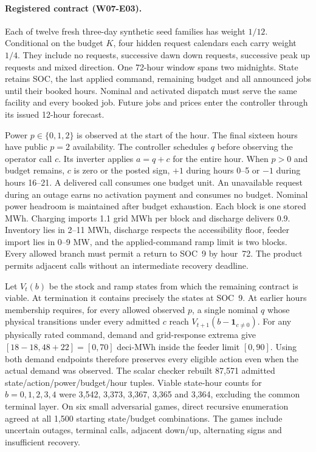 \documentclass[11pt,letterpaper]{article}
\begin{document}
\paragraph{Registered contract (W07-E03).}
Each of twelve fresh three-day synthetic seed families has weight $1/12$. Conditional on the budget $K$, four hidden request calendars each carry weight $1/4$. They include no requests, successive dawn down requests, successive peak up requests and mixed direction. One 72-hour window spans two midnights. State retains SOC, the last applied command, remaining budget and all announced jobs until their booked hours. Nominal and activated dispatch must serve the same facility and every booked job. Future jobs and prices enter the controller through its issued 12-hour forecast.

Power $p\in\{0,1,2\}$ is observed at the start of the hour. The final sixteen hours have public $p=2$ availability. The controller schedules $q$ before observing the operator call $c$. Its inverter applies $a=q+c$ for the entire hour. When $p>0$ and budget remains, $c$ is zero or the posted sign, $+1$ during hours 0--5 or $-1$ during hours 16--21. A delivered call consumes one budget unit. An unavailable request during an outage earns no activation payment and consumes no budget. Nominal power headroom is maintained after budget exhaustion. Each block is one stored MWh. Charging imports 1.1 grid MWh per block and discharge delivers 0.9. Inventory lies in 2--11 MWh, discharge respects the accessibility floor, feeder import lies in 0--9 MW, and the applied-command ramp limit is two blocks. Every allowed branch must permit a return to SOC~9 by hour~72. The product permits adjacent calls without an intermediate recovery deadline.

Let $V_t(b)$ be the stock and ramp states from which the remaining contract is viable. At termination it contains precisely the states at SOC~9. At earlier hours membership requires, for every allowed observed $p$, a single nominal $q$ whose physical transitions under every admitted $c$ reach $V_{t+1}(b-\mathbf{1}_{c\ne0})$. For any physically rated command, demand and grid-response extrema give $[18-18,48+22]=[0,70]$ deci-MWh inside the feeder limit $[0,90]$. Using both demand endpoints therefore preserves every eligible action even when the actual demand was observed. The scalar checker rebuilt 87,571 admitted state/action/power/budget/hour tuples. Viable state-hour counts for $b=0,1,2,3,4$ were 3,542, 3,373, 3,367, 3,365 and 3,364, excluding the common terminal layer. On six small adversarial games, direct recursive enumeration agreed at all 1,500 starting state/budget combinations. The games include uncertain outages, terminal calls, adjacent down/up, alternating signs and insufficient recovery.
\end{document}
